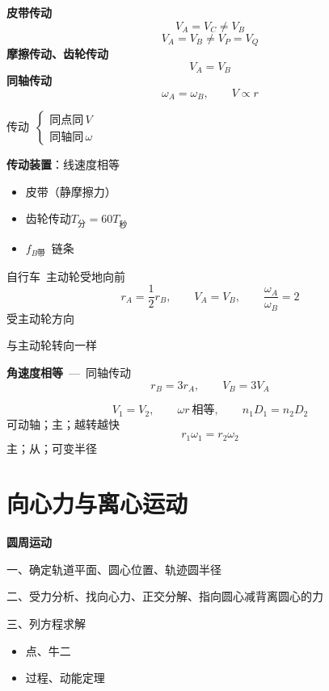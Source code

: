 \textbf{皮带传动}
\[ V_A=V_C\neq V_B \]
\[ V_A=V_B\neq V_P=V_Q \]
\textbf{摩擦传动、齿轮传动}
\[ V_A=V_B \]
\textbf{同轴传动}
\[ \omega_A=\omega_B,\qquad V\propto r \]

传动\ $\begin{cases}\text{同点同}\,V\\ \text{同轴同}\,\omega\end{cases}$

\textbf{传动装置}：线速度相等
\begin{itemize}
\item 皮带（静摩擦力）
\item 齿轮传动\quad $T_{\text{分}}=60T_{\text{秒}}$\quad {}
\item $f_{B\text{带}}$\ 链条
\end{itemize}
自行车\ 主动轮\quad 受地向前
\[ r_A=\frac{1}{2}r_B,\qquad V_A=V_B,\qquad \frac{\omega_A}{\omega_B}=2 \]
受主动轮方向\par
与主动轮转向一样

\textbf{角速度相等}\ —\ 同轴传动
\[ r_B=3r_A,\qquad V_B=3V_A \]

\[ V_1=V_2,\qquad \omega r\ \text{相等},\qquad n_1D_1=n_2D_2 \]
可动轴；主；越转越快
\[ r_1\omega_1=r_2\omega_2 \]
主；从；可变半径


\section{向心力与离心运动}
\textbf{圆周运动}
\par 一、确定轨道平面、圆心位置、轨迹圆半径
\par 二、受力分析、找向心力、正交分解、指向圆心减背离圆心的力
\par 三、列方程求解
\begin{itemize}
\item 点、牛二
\item 过程、动能定理
\end{itemize}

